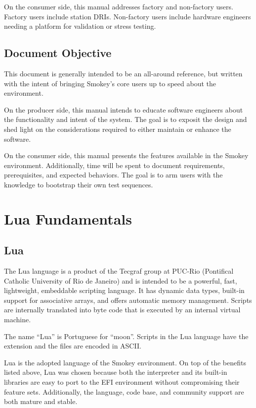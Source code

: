 On the consumer side, this manual addresses factory and non-factory users.
Factory users include station DRIs.  Non-factory users include hardware
engineers needing a platform for validation or stress testing.

\subsection{Document Objective}

This document is generally intended to be an all-around reference, but written
with the intent of bringing Smokey's core users up to speed about the
environment.  

On the producer side, this manual intends to educate software engineers about
the functionality and intent of the system.  The goal is to exposit the design
and shed light on the considerations required to either maintain or enhance the
software.

On the consumer side, this manual presents the features available in the Smokey
environment.  Additionally, time will be spent to document requirements,
prerequisites, and expected behaviors.  The goal is to arm users with the
knowledge to bootstrap their own test sequences.


\section{Lua Fundamentals}

\subsection{Lua}

The Lua language is a product of the Tecgraf group at PUC-Rio (Pontifical
Catholic University of Rio de Janeiro) and is intended to be a powerful, fast,
lightweight, embeddable scripting language.  It has dynamic data types,
built-in support for associative arrays, and offers automatic memory
management.  Scripts are internally translated into byte code that is executed
by an internal virtual machine.

The name ``Lua'' is Portuguese for ``moon''.  Scripts in the Lua language have
the extension  and the files are encoded in ASCII.

Lua is the adopted language of the Smokey environment.  On top of the benefits
listed above, Lua was chosen because both the interpreter and its built-in
libraries are easy to port to the EFI environment without compromising their
feature sets.  Additionally, the language, code base, and community support are
both mature and stable.

